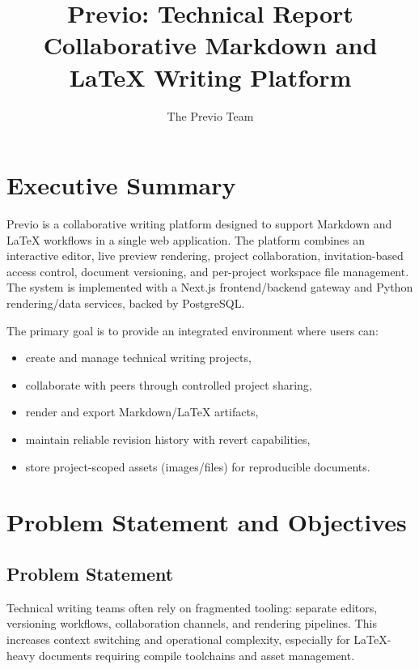 \documentclass[11pt,a4paper]{article}
\title{
  \vspace{-1cm}
  \textbf{Previo: Technical Report}\\
  \large Collaborative Markdown and LaTeX Writing Platform
}
\author{The Previo Team}
\date{}
\begin{document}
\maketitle
\newpage
\tableofcontents
\newpage

\section{Executive Summary}
Previo is a collaborative writing platform designed to support Markdown and LaTeX workflows in a single web application. The platform combines an interactive editor, live preview rendering, project collaboration, invitation-based access control, document versioning, and per-project workspace file management. The system is implemented with a Next.js frontend/backend gateway and Python rendering/data services, backed by PostgreSQL.

The primary goal is to provide an integrated environment where users can:
\begin{itemize}[leftmargin=1.5em]
  \item create and manage technical writing projects,
  \item collaborate with peers through controlled project sharing,
  \item render and export Markdown/LaTeX artifacts,
  \item maintain reliable revision history with revert capabilities,
  \item store project-scoped assets (images/files) for reproducible documents.
\end{itemize}

\section{Problem Statement and Objectives}
\subsection{Problem Statement}
Technical writing teams often rely on fragmented tooling: separate editors, versioning workflows, collaboration channels, and rendering pipelines. This increases context switching and operational complexity, especially for LaTeX-heavy documents requiring compile toolchains and asset management.
\end{document}
